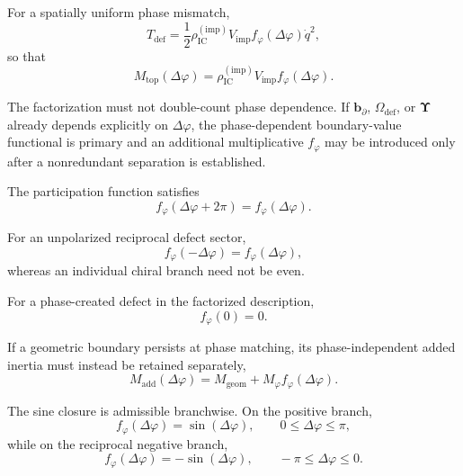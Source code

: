 For a spatially uniform phase mismatch,
\begin{equation}
    T_{\mathrm{def}}
    =
    \frac{1}{2}
    \rho_{\mathrm{IC}}^{(\mathrm{imp})}
    V_{\mathrm{imp}}
    f_{\varphi}(\Delta\varphi)
    \dot{q}^2,
\end{equation}
so that
\begin{equation}
    M_{\mathrm{top}}(\Delta\varphi)
    =
    \rho_{\mathrm{IC}}^{(\mathrm{imp})}
    V_{\mathrm{imp}}
    f_{\varphi}(\Delta\varphi).
\end{equation}

The factorization must not double-count phase dependence. If $\mathbf{b}_{\partial}$, $\Omega_{\mathrm{def}}$, or $\boldsymbol{\Upsilon}$ already depends explicitly on $\Delta\varphi$, the phase-dependent boundary-value functional is primary and an additional multiplicative $f_{\varphi}$ may be introduced only after a nonredundant separation is established.

The participation function satisfies
\begin{equation}
    f_{\varphi}(\Delta\varphi+2\pi)
    =
    f_{\varphi}(\Delta\varphi).
\end{equation}

For an unpolarized reciprocal defect sector,
\begin{equation}
    f_{\varphi}(-\Delta\varphi)
    =
    f_{\varphi}(\Delta\varphi),
\end{equation}
whereas an individual chiral branch need not be even.

For a phase-created defect in the factorized description,
\begin{equation}
    f_{\varphi}(0)
    =
    0.
\end{equation}

If a geometric boundary persists at phase matching, its phase-independent added inertia must instead be retained separately,
\begin{equation}
    M_{\mathrm{add}}(\Delta\varphi)
    =
    M_{\mathrm{geom}}
    +
    M_{\varphi}
    f_{\varphi}(\Delta\varphi).
\end{equation}

The sine closure is admissible branchwise. On the positive branch,
\begin{equation}
    f_{\varphi}(\Delta\varphi)
    =
    \sin(\Delta\varphi),
    \qquad
    0
    \leq
    \Delta\varphi
    \leq
    \pi,
\end{equation}
while on the reciprocal negative branch,
\begin{equation}
    f_{\varphi}(\Delta\varphi)
    =
    -\sin(\Delta\varphi),
    \qquad
    -\pi
    \leq
    \Delta\varphi
    \leq
    0.
\end{equation}


